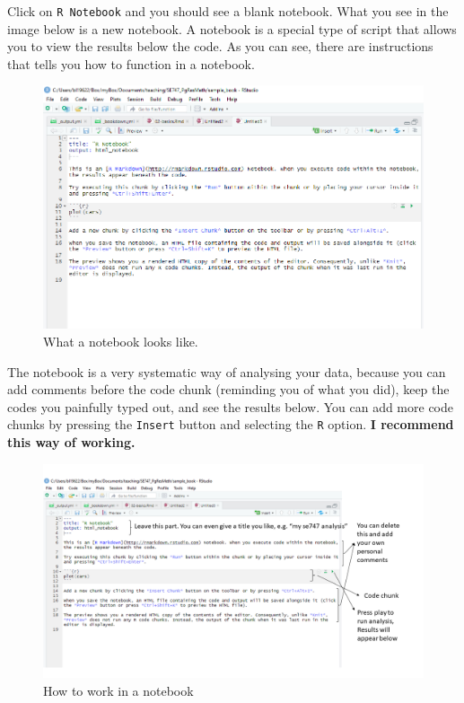 \documentclass[
]{book}
\begin{document}
Click on \texttt{R\ Notebook} and you should see a blank notebook. What you see in the image below is a new notebook. A notebook is a special type of script that allows you to view the results below the code. As you can see, there are instructions that tells you how to function in a notebook.

\begin{figure}

{\centering \includegraphics[width=0.75\linewidth]{images/notebook_in_source} 

}

\caption{What a notebook looks like.}\label{fig:notebookview}
\end{figure}

The notebook is a very systematic way of analysing your data, because you can add comments before the code chunk (reminding you of what you did), keep the codes you painfully typed out, and see the results below. You can add more code chunks by pressing the \texttt{Insert} button and selecting the \texttt{R} option. \textbf{I recommend this way of working.}

\begin{figure}

{\centering \includegraphics[width=0.75\linewidth]{images/notebook_instruc} 

}

\caption{How to work in a notebook }\label{fig:notebookinstruc}
\end{figure}
\end{document}
